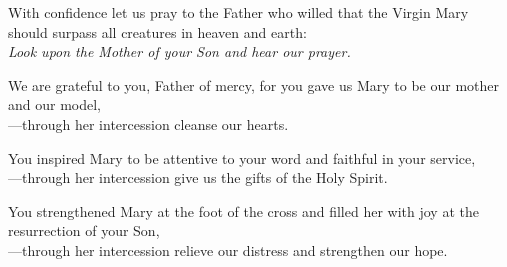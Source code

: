 \intercessions

\begin{raggedright}
With confidence let us pray to the Father who willed that the Virgin Mary should surpass all creatures in heaven and earth:\\
\emph{Look upon the Mother of your Son and hear our prayer.}

\medskip
We are grateful to you, Father of mercy, for you gave us Mary to be our mother and our model,\\
{\color{red}---}through her intercession cleanse our hearts.

\medskip
You inspired Mary to be attentive to your word and faithful in your service,\\
{\color{red}---}through her intercession give us the gifts of the Holy Spirit.

\medskip
You strengthened Mary at the foot of the cross and filled her with joy at the resurrection of your Son,\\
{\color{red}---}through her intercession relieve our distress and strengthen our hope.
\end{raggedright}